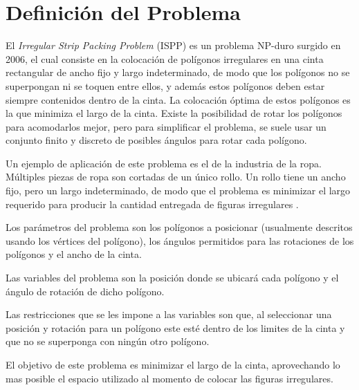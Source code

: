 \section{Definición del Problema}

El \textit{Irregular Strip Packing Problem} (ISPP) es un problema NP-duro surgido en 2006\cite{BottomLeftFillHeuristic2006}, el cual consiste en la colocación de polígonos irregulares en una cinta rectangular de ancho fijo y largo indeterminado, de modo que los polígonos no se superpongan ni se toquen entre ellos, y además estos polígonos deben estar siempre contenidos dentro de la cinta. La colocación óptima de estos polígonos es la que minimiza el largo de la cinta. Existe la posibilidad de rotar los polígonos para acomodarlos mejor, pero para simplificar el problema, se suele usar un conjunto finito y discreto de posibles ángulos para rotar cada polígono.

Un ejemplo de aplicación de este problema es el de la industria de la ropa. Múltiples piezas de ropa son cortadas de un único rollo. Un rollo tiene un ancho fijo, pero un largo indeterminado, de modo que el problema es minimizar el largo requerido para producir la cantidad entregada de figuras irregulares \cite{Leung2012LocalSearch}.

Los parámetros del problema son los polígonos a posicionar (usualmente descritos usando los vértices del polígono), los ángulos permitidos para las rotaciones de los polígonos y el ancho de la cinta.

Las variables del problema son la posición donde se ubicará cada polígono y el ángulo de rotación de dicho polígono.

Las restricciones que se les impone a las variables son que, al seleccionar una posición y rotación para un polígono este esté dentro de los limites de la cinta y que no se superponga con ningún otro polígono.

El objetivo de este problema es minimizar el largo de la cinta, aprovechando lo mas posible el espacio utilizado al momento de colocar las figuras irregulares.

